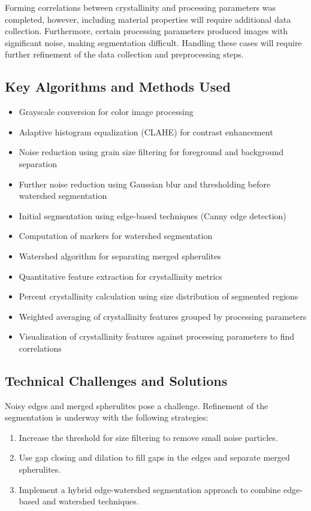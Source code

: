 \documentclass[12pt]{article}
\begin{document}
Forming correlations between crystallinity and processing parameters was completed, however, including material properties will require
 additional data collection. Furthermore, certain processing parameters produced images with significant noise, making segmentation 
 difficult. Handling these cases will require further refinement of the data collection and preprocessing steps.

\subsection{Key Algorithms and Methods Used}
\begin{itemize}[noitemsep]
    \item Grayscale conversion for color image processing
    \item Adaptive histogram equalization (CLAHE) for contrast enhancement
    \item Noise reduction using grain size filtering for foreground and background separation
    \item Further noise reduction using Gaussian blur and thresholding before watershed segmentation
    \item Initial segmentation using edge-based techniques (Canny edge detection)
    \item Computation of markers for watershed segmentation
    \item Watershed algorithm for separating merged spherulites
    \item Quantitative feature extraction for crystallinity metrics
    \item Percent crystallinity calculation using size distribution of segmented regions
    \item Weighted averaging of crystallinity features grouped by processing parameters
    \item Visualization of crystallinity features against processing parameters to find correlations
\end{itemize}

\subsection{Technical Challenges and Solutions}
Noisy edges and merged spherulites pose a challenge. Refinement of the segmentation is underway with the following strategies:
\begin{enumerate}[noitemsep]
    \item Increase the threshold for size filtering to remove small noise particles.
    \item Use gap closing and dilation to fill gaps in the edges and separate merged spherulites.
    \item Implement a hybrid edge-watershed segmentation approach to combine edge-based and watershed techniques.
\end{enumerate}
\end{document}
